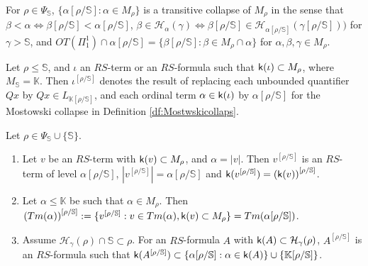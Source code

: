 \documentclass{article}
\newcommand{\mS}{\mathbb{S}}
\begin{document}
\blem\label{lem:Mostowskicollapspi11}
For $\rho\in\Psi_{\mS}$,
$\{\alpha[\rho/\mS]:\alpha\in M_{\rho}\}$ is a transitive collapse of $M_{\rho}$ in the sense that
$\beta<\alpha\Leftrightarrow\beta[\rho/\mS]<\alpha[\rho/\mS]$,
$\beta\in\mathcal{H}_{\alpha}(\gamma)\Leftrightarrow 
\beta[\rho/\mS]\in\mathcal{H}_{\alpha[\rho/\mS]}(\gamma[\rho/\mS]))
$ for $\gamma>\mathbb{S}$,
and
$OT(\Pi^{1}_{1})\cap\alpha[\rho/\mS]=\{\beta[\rho/\mS]:\beta\in M_{\rho}\cap\alpha\}$
for $\alpha,\beta,\gamma\in M_{\rho}$.
\elem








Let $\rho\leq\mathbb{S}$, and
$\iota$ an $RS$-term or an $RS$-formula such that
${\sf k}(\iota)\subset M_{\rho}$, where $M_{\mathbb{S}}=\mathbb{K}$.
Then
$\iota^{[\rho/\mathbb{S}]}$ denotes the result of replacing each unbounded quantifier
$Qx$ by $Qx\in L_{\mathbb{K}[\rho/\mS]}$,
and each ordinal term $\alpha\in {\sf k}(\iota)$
by $\alpha[\rho/\mS]$ for the Mostowski collapse in
Definition \ref{df:Mostwskicollaps}.




 


\bprp\label{prp:levelcollaps}
Let $\rho\in \Psi_{\mS}\cup\{\mathbb{S}\}$.

\begin{enumerate}
\item\label{prp:levelcollaps1}
Let $v$ be an $RS$-term with ${\sf k}(v)\subset M_{\rho}$,
and $\alpha=|v|$.
Then 
$v^{[\rho/\mathbb{S}]}$ is an $RS$-term of level $\alpha[\rho/\mS]$,
$\left| v^{[\rho/\mathbb{S}]} \right|=\alpha[\rho/\mS]$ and
${\sf k}(v^{[\rho/\mathbb{S}]})=\left({\sf k}(v)\right)^{[\rho/\mathbb{S}]}$.

\item\label{prp:levelcollaps2}
Let $\alpha\leq\mathbb{K}$ be such that $\alpha\in M_{\rho}$. Then
$
\left(Tm(\alpha)\right)^{[\rho/\mathbb{S}]}
:= 
\{v^{[\rho/\mathbb{S}]}: v\in Tm(\alpha), {\sf k}(v)\subset M_{\rho}\}
= Tm(\alpha[\rho/\mS])$.


\item\label{prp:levelcollaps3}
Assume $\mathcal{H}_{\gamma}(\rho)\cap\mathbb{S}\subset\rho$.
For an $RS$-formula $A$ with ${\sf k}(A)\subset \mathcal{H}_{\gamma}(\rho)$, 
$A^{[\rho/\mathbb{S}]}$ is an $RS$-formula such that
${\sf k}(A^{[\rho/\mathbb{S}]})\subset\{\alpha[\rho/\mS]: \alpha\in{\sf k}(A)\}\cup\{\mathbb{K}[\rho/\mS]\}$.
\end{enumerate}
\eprp
\end{document}
